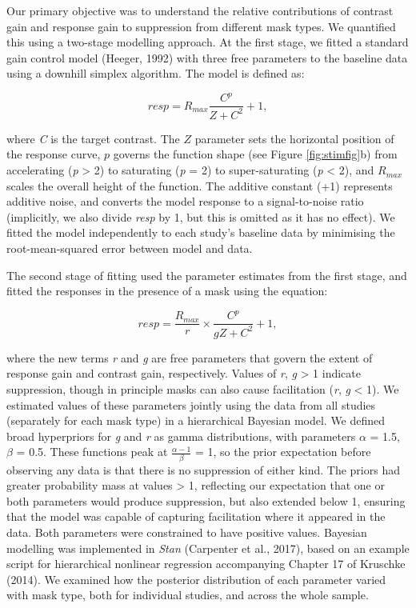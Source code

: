\documentclass[]{article}
\begin{document}
Our primary objective was to understand the relative contributions of contrast gain and response gain to suppression from different mask types. We quantified this using a two-stage modelling approach. At the first stage, we fitted a standard gain control model (Heeger, 1992) with three free parameters to the baseline data using a downhill simplex algorithm. The model is defined as:

\begin{equation}
\label{eq:GC1}
resp = R_{max}\frac{C^p}{Z + C^2} + 1,
\end{equation}

where \emph{C} is the target contrast. The \(Z\) parameter sets the horizontal position of the response curve, \(p\) governs the function shape (see Figure \ref{fig:stimfig}b) from accelerating (\emph{p} \textgreater{} 2) to saturating (\emph{p} = 2) to super-saturating (\emph{p} \textless{} 2), and \(R_{max}\) scales the overall height of the function. The additive constant (+1) represents additive noise, and converts the model response to a signal-to-noise ratio (implicitly, we also divide \emph{resp} by 1, but this is omitted as it has no effect). We fitted the model independently to each study's baseline data by minimising the root-mean-squared error between model and data.

The second stage of fitting used the parameter estimates from the first stage, and fitted the responses in the presence of a mask using the equation:

\begin{equation}
\label{eq:GC2}
resp = \frac{R_{max}}{r} \times \frac{C^p}{gZ + C^2} + 1,
\end{equation}

where the new terms \emph{r} and \emph{g} are free parameters that govern the extent of response gain and contrast gain, respectively. Values of \emph{r}, \emph{g} \textgreater{} 1 indicate suppression, though in principle masks can also cause facilitation (\emph{r}, \emph{g} \textless{} 1). We estimated values of these parameters jointly using the data from all studies (separately for each mask type) in a hierarchical Bayesian model. We defined broad hyperpriors for \emph{g} and \emph{r} as gamma distributions, with parameters \(\alpha\) = 1.5, \(\beta\) = 0.5. These functions peak at \(\frac{\alpha-1}{\beta}\) = 1, so the prior expectation before observing any data is that there is no suppression of either kind. The priors had greater probability mass at values \textgreater{} 1, reflecting our expectation that one or both parameters would produce suppression, but also extended below 1, ensuring that the model was capable of capturing facilitation where it appeared in the data. Both parameters were constrained to have positive values. Bayesian modelling was implemented in \emph{Stan} (Carpenter et al., 2017), based on an example script for hierarchical nonlinear regression accompanying Chapter 17 of Kruschke (2014). We examined how the posterior distribution of each parameter varied with mask type, both for individual studies, and across the whole sample.
\end{document}

